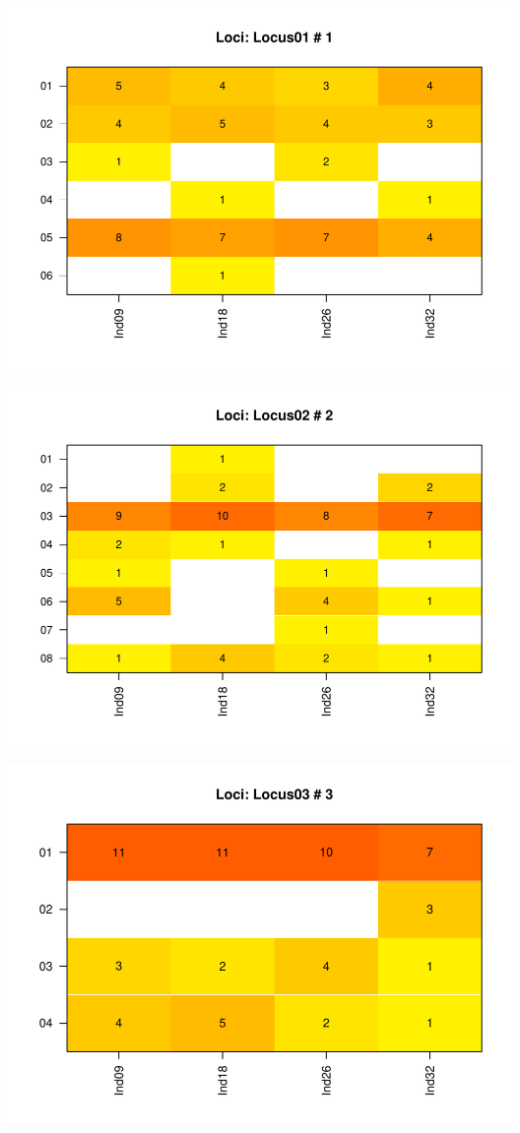 \documentclass[a4paper]{scrartcl}\usepackage[]{graphicx}\usepackage[]{color}
\makeatletter
\def\maxwidth{ %
  \ifdim\Gin@nat@width>\linewidth
    \linewidth
  \else
    \Gin@nat@width
  \fi
}
\newenvironment{knitrout}{}{} %
\makeatother
\begin{document}
\FloatBarrier
\begin{knitrout}
\color{fgcolor}
\includegraphics[width=\maxwidth]{PopGenReport-heatmap-1} 

\includegraphics[width=\maxwidth]{PopGenReport-heatmap-2} 

\includegraphics[width=\maxwidth]{PopGenReport-heatmap-3} 


\end{knitrout}
\end{document}
